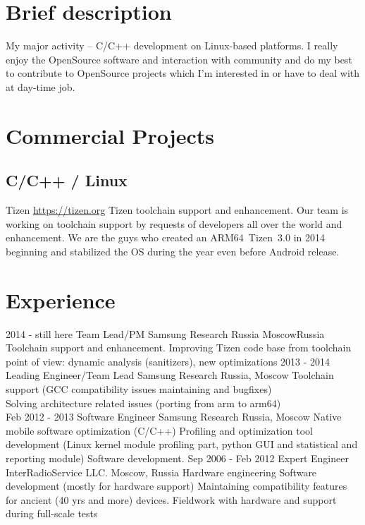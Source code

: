 \documentclass[11pt,a4paper]{moderncv}
\begin{document}
\maketitle

\section{Brief description}
\cvitem {} {My major activity -- C/C++ development on Linux-based platforms.\newline{} I really enjoy the OpenSource
  software and interaction with community and do my best to contribute to OpenSource projects which I'm interested in or
  have to deal with at day-time job.}
\section{Commercial Projects}
  \subsection{C/C++ / Linux}
  \cvitem
    {Tizen}
    {\url{https://tizen.org}\newline{}
      Tizen toolchain support and enhancement.\newline{} Our team is working on toolchain support by requests of
      developers all over the world and enhancement. We are the guys who created an ARM64~Tizen~3.0 in 2014 beginning
      and stabilized the OS during the year even before Android release.}
\section{Experience}
\cventry
  {2014 - still here}
  {Team Lead/PM}
  {Samsung Research Russia}
  {Moscow}{Russia}
  {Toolchain support and enhancement. Improving Tizen code base from toolchain point of view: dynamic analysis
    (sanitizers), new optimizations}
\cventry
  {2013 - 2014}
  {Leading Engineer/Team Lead}
  {Samsung Research Russia, Moscow}
  {}{}
  {Toolchain support (GCC compatibility issues maintaining and bugfixes)\\
Solving architecture related issues (porting from arm to arm64)\\}
\cventry
  {Feb 2012 - 2013}
  {Software Engineer}
  {Samsung Research Russia, Moscow}
  {}{}
  {Native mobile software optimization (C/C++)\newline{}
Profiling and optimization tool development (Linux kernel module profiling part, python GUI and statistical and reporting module)\newline{}
Software development.}
\cventry
  {Sep 2006 - Feb 2012}
  {Expert Engineer}
  {InterRadioService LLC. Moscow, Russia}
  {}{}
  {Hardware engineering\newline{}
Software development (mostly for hardware support)\newline{}
Maintaining compatibility features for ancient (40 yrs and more) devices.\newline{}
Fieldwork with hardware and support during full-scale tests\newline{}}
\end{document}
